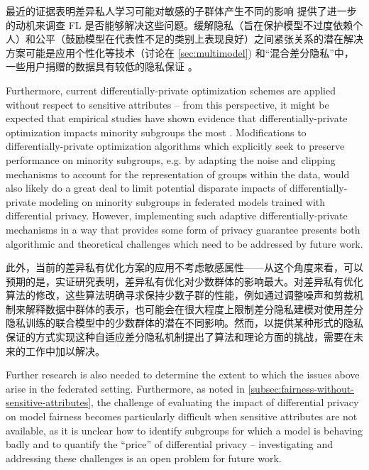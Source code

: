 最近的证据表明差异私人学习可能对敏感的子群体产生不同的影响 \cite{bagdasaryan2019disparate, CGKM19, jagielski2018privatefair, kuppam2019fair} 提供了进一步的动机来调查 FL 是否能够解决这些问题。缓解隐私（旨在保护模型不过度依赖个人）和公平（鼓励模型在代表性不足的类别上表现良好）之间紧张关系的潜在解决方案可能是应用个性化等技术（讨论在 \cref{sec:multimodel}) 和“混合差分隐私”中，一些用户捐赠的数据具有较低的隐私保证 \cite{avent2017blender}。




Furthermore, current differentially-private optimization schemes are applied without respect to sensitive attributes -- from this perspective, it might be expected that empirical studies have shown evidence that differentially-private optimization impacts minority subgroups the most \cite{bagdasaryan2019disparate}. Modifications to differentially-private optimization algorithms which explicitly seek to preserve performance on minority subgroups, e.g. by adapting the noise and clipping mechanisms to account for the representation of groups within the data, would also likely do a great deal to limit potential disparate impacts of differentially-private modeling on minority subgroups in federated models trained with differential privacy. However, implementing such adaptive differentially-private mechanisms in a way that provides some form of privacy guarantee presents both algorithmic and theoretical challenges which need to be addressed by future work. 

此外，当前的差异私有优化方案的应用不考虑敏感属性——从这个角度来看，可以预期的是，实证研究表明，差异私有优化对少数群体的影响最大。对差异私有优化算法的修改，这些算法明确寻求保持少数子群的性能，例如通过调整噪声和剪裁机制来解释数据中群体的表示，也可能会在很大程度上限制差分隐私建模对使用差分隐私训练的联合模型中的少数群体的潜在不同影响。然而，以提供某种形式的隐私保证的方式实现这种自适应差分隐私机制提出了算法和理论方面的挑战，需要在未来的工作中加以解决。


Further research is also needed to determine the extent to which the issues above arise in the federated setting. Furthermore, as noted in \cref{subsec:fairness-without-sensitive-attributes}, the challenge of evaluating the impact of differential privacy on model fairness becomes particularly difficult when sensitive attributes are not available, as it is unclear how to identify subgroups for which a model is behaving badly and to quantify the ``price'' of differential privacy -- investigating and addressing these challenges is an open problem for future work.
 
